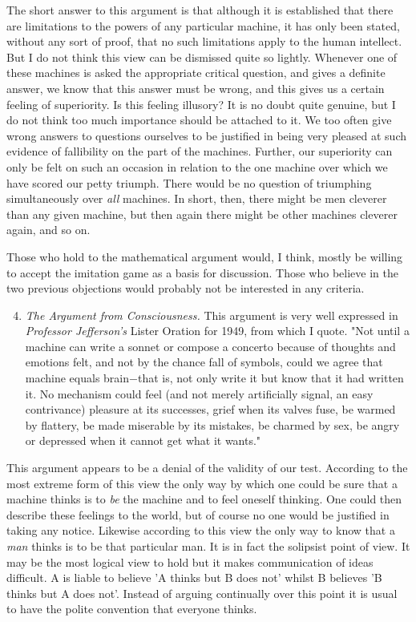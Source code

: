     The short answer to this argument is that although it is established that there are limitations to the powers of any particular machine, it has only been stated, without any sort of proof, that no such limitations apply to the human intellect. But I do not think this view can be dismissed quite so lightly. Whenever one of these machines is asked the appropriate critical question, and gives a definite answer, we know that this answer must be wrong, and this gives us a certain feeling of superiority. Is this feeling illusory? It is no doubt quite genuine, but I do not think too much importance should be attached to it. We too often give wrong answers to questions ourselves to be justified in being very pleased at such evidence of fallibility on the part of the machines. Further, our superiority can only be felt on such an occasion in relation to the one machine over which we have scored our petty triumph. There would be no question of triumphing simultaneously over \textit{all} machines. In short, then, there might be men cleverer than any given machine, but then again there might be other machines cleverer again, and so on.

    Those who hold to the mathematical argument would, I think, mostly be willing to accept the imitation game as a basis for discussion. Those who believe in the two previous objections would probably not be interested in any criteria.
    
    \begin{enumerate}[label=(\arabic*)]
        \setcounter{enumi}{3}
        \item{\textit{The Argument from Consciousness.} This argument is very well expressed in \textit{Professor Jefferson's} Lister Oration for 1949, from which I quote. "Not until a machine can write a sonnet or compose a concerto because of thoughts and emotions felt, and not by the chance fall of symbols, could we agree that machine equals brain$-$that is, not only write it but know that it had written it. No mechanism could feel (and not merely artificially signal, an easy contrivance) pleasure at its successes, grief when its valves fuse, be warmed by flattery, be made miserable by its mistakes, be charmed by sex, be angry or depressed when it cannot get what it wants."}
    \end{enumerate}

    This argument appears to be a denial of the validity of our test. According to the most extreme form of this view the only way by which one could be sure that a machine thinks is to \textit{be} the machine and to feel oneself thinking. One could then describe these feelings to the world, but of course no one would be justified in taking any notice. Likewise according to this view the only way to know that a \textit{man} thinks is to be that particular man. It is in fact the solipsist point of view. It may be the most logical view to hold but it makes communication of ideas difficult. A is liable to believe 'A thinks but B does not' whilst B believes 'B thinks but A does not'. Instead of arguing continually over this point it is usual to have the polite convention that everyone thinks.


